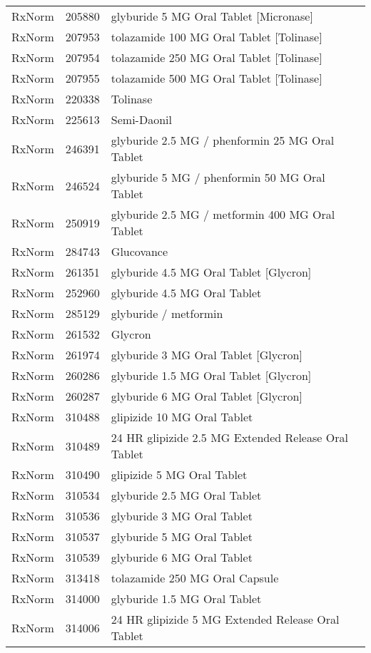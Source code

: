 \begin{longtable}{p{}p{}p{}}
  RxNorm & 205880 & glyburide 5 MG Oral Tablet [Micronase] \\ 
  RxNorm & 207953 & tolazamide 100 MG Oral Tablet [Tolinase] \\ 
  RxNorm & 207954 & tolazamide 250 MG Oral Tablet [Tolinase] \\ 
  RxNorm & 207955 & tolazamide 500 MG Oral Tablet [Tolinase] \\ 
  RxNorm & 220338 & Tolinase \\ 
  RxNorm & 225613 & Semi-Daonil \\ 
  RxNorm & 246391 & glyburide 2.5 MG / phenformin 25 MG Oral Tablet \\ 
  RxNorm & 246524 & glyburide 5 MG / phenformin 50 MG Oral Tablet \\ 
  RxNorm & 250919 & glyburide 2.5 MG / metformin 400 MG Oral Tablet \\ 
  RxNorm & 284743 & Glucovance \\ 
  RxNorm & 261351 & glyburide 4.5 MG Oral Tablet [Glycron] \\ 
  RxNorm & 252960 & glyburide 4.5 MG Oral Tablet \\ 
  RxNorm & 285129 & glyburide / metformin \\ 
  RxNorm & 261532 & Glycron \\ 
  RxNorm & 261974 & glyburide 3 MG Oral Tablet [Glycron] \\ 
  RxNorm & 260286 & glyburide 1.5 MG Oral Tablet [Glycron] \\ 
  RxNorm & 260287 & glyburide 6 MG Oral Tablet [Glycron] \\ 
  RxNorm & 310488 & glipizide 10 MG Oral Tablet \\ 
  RxNorm & 310489 & 24 HR glipizide 2.5 MG Extended Release Oral Tablet \\ 
  RxNorm & 310490 & glipizide 5 MG Oral Tablet \\ 
  RxNorm & 310534 & glyburide 2.5 MG Oral Tablet \\ 
  RxNorm & 310536 & glyburide 3 MG Oral Tablet \\ 
  RxNorm & 310537 & glyburide 5 MG Oral Tablet \\ 
  RxNorm & 310539 & glyburide 6 MG Oral Tablet \\ 
  RxNorm & 313418 & tolazamide 250 MG Oral Capsule \\ 
  RxNorm & 314000 & glyburide 1.5 MG Oral Tablet \\ 
  RxNorm & 314006 & 24 HR glipizide 5 MG Extended Release Oral Tablet \\ 

\end{longtable}
